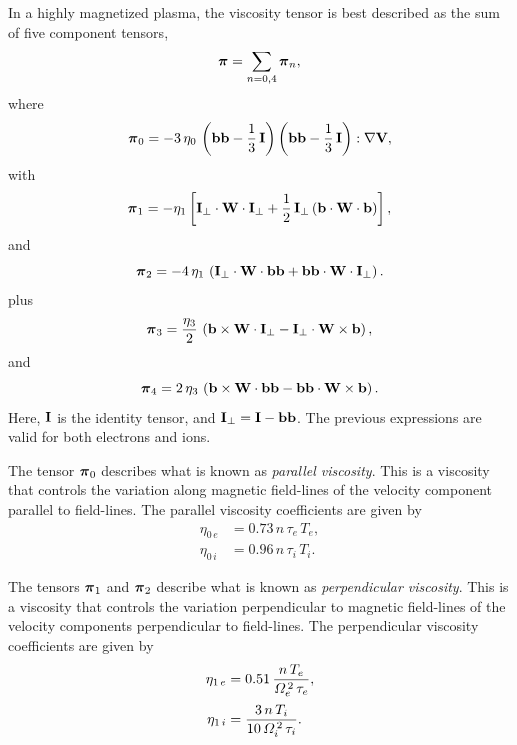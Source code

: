 \documentclass[notitlepage,12pt]{article}
\newcommand{\bpi}{\mbox{\boldmath$\pi$}}
\begin{document}
In a highly magnetized plasma, the viscosity tensor is best described as the
sum of  five component tensors,
\begin{equation}
\bpi  = \sum_{n=0,4} \bpi_n,
\end{equation}
where 
\begin{equation}
\bpi_0 = - 3\,\eta_0\,\left({\bf b}{\bf b} - \frac{1}{3}\,{\bf I}\right)
\left({\bf b}{\bf b} - \frac{1}{3}\,{\bf I}\right): \nabla {\bf V},
\end{equation}
with
\begin{equation}
\bpi_1 =- \eta_1\left[{\bf I}_\perp \cdot{\bf W}\cdot{\bf I}_\perp
+ \frac{1}{2}\,{\bf I}_\perp\,({\bf b}\cdot{\bf W}\cdot{\bf b})\right],
\end{equation}
and
\begin{equation}
\bpi_2 = -4\,\eta_1\,\left({\bf I}_\perp\cdot
{\bf W}\cdot{\bf b}{\bf b}
+ {\bf b}{\bf b}\cdot{\bf W} \cdot{\bf I}_\perp\right).
\end{equation}
plus
\begin{equation}
\bpi_3 = \frac{\eta_3}{2}\,\left( {\bf b}\times 
{\bf W}\cdot{\bf I}_\perp - {\bf I}_\perp\cdot{\bf W}\times{\bf b}
\right),
\end{equation}
and
\begin{equation}
\bpi_4 = 2\,\eta_3\,\left({\bf b} \times{\bf W} \cdot {\bf b}{\bf b}
- {\bf b}{\bf b} \cdot{\bf W} \times{\bf b}\right).
\end{equation}
Here, ${\bf I}$ is the identity tensor, and 
${\bf I}_\perp = {\bf I} - {\bf b}{\bf b}$. The previous 
expressions are valid for both electrons and ions. 

The tensor $\bpi_0$ describes what is known as {\em parallel viscosity}.
This is a viscosity that controls the variation along magnetic field-lines of the
velocity component parallel to  field-lines.
 The parallel
viscosity coefficients are given by 
\begin{align}\label{e3.89a}
\eta_{0\,e} &= 0.73\,n\,\tau_e\,T_e,\\[0.5ex]
\eta_{0\,i} &= 0.96\,n\,\tau_i\,T_i.\label{e3.89b}
\end{align}

The tensors $\bpi_1$ and $\bpi_2$ describe what is known
as {\em perpendicular viscosity}. This is a viscosity
that controls the variation perpendicular to magnetic field-lines
of the velocity components perpendicular to field-lines. The perpendicular
viscosity coefficients are given by
\begin{align}
\eta_{1\,e} &= 0.51\, \frac{n\,T_e}{{\mit\Omega}_e^{\,2}\,\tau_e},\\[0.5ex]
\eta_{1\,i} &= \frac{3\, n\,T_i}{10\,{\mit\Omega}_i^{\,2}\,\tau_i}.
\end{align}
\end{document}
